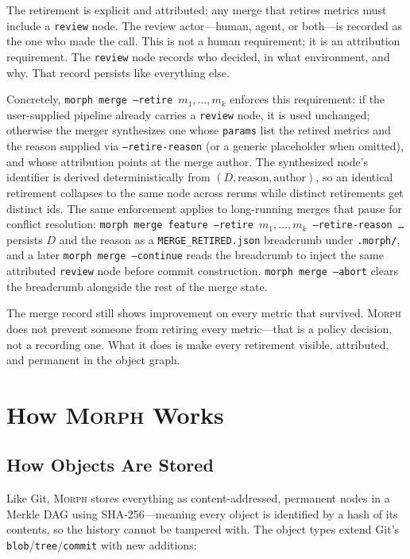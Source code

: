 \documentclass{article}
\begin{document}
The retirement is explicit and attributed: any merge that retires metrics must
include a \texttt{review} node. The review actor---human, agent, or both---is
recorded as the one who made the call. This is not a human requirement; it is
an attribution requirement. The \texttt{review} node records who decided, in
what environment, and why. That record persists like everything else.

Concretely, \texttt{morph merge --retire $m_1,\dots,m_k$} enforces this
requirement: if the user-supplied pipeline already carries a \texttt{review}
node, it is used unchanged; otherwise the merger synthesizes one whose
\texttt{params} list the retired metrics and the reason supplied via
\texttt{--retire-reason} (or a generic placeholder when omitted), and whose
attribution points at the merge author. The synthesized node's identifier is
derived deterministically from $(D, \text{reason}, \text{author})$, so an
identical retirement collapses to the same node across reruns while distinct
retirements get distinct ids. The same enforcement applies to long-running
merges that pause for conflict resolution: \texttt{morph merge feature
--retire $m_1,\dots,m_k$ --retire-reason \dots} persists $D$ and the reason
as a \texttt{MERGE\_RETIRED.json} breadcrumb under \texttt{.morph/}, and a
later \texttt{morph merge --continue} reads the breadcrumb to inject the
same attributed \texttt{review} node before commit construction.
\texttt{morph merge --abort} clears the breadcrumb alongside the rest of
the merge state.

The merge record still shows improvement on every metric that survived.
\textsc{Morph} does not prevent someone from retiring every metric---that is a
policy decision, not a recording one. What it does is make every retirement
visible, attributed, and permanent in the object graph.

\section{How \textsc{Morph} Works}
\label{sec:system}

\subsection{How Objects Are Stored}

Like Git, \textsc{Morph} stores everything as content-addressed, permanent
nodes in a Merkle DAG using SHA-256---meaning every object is identified by
a hash of its contents, so the history cannot be tampered with. The object
types extend Git's \texttt{blob}/\texttt{tree}/\texttt{commit} with new
additions:
\end{document}
